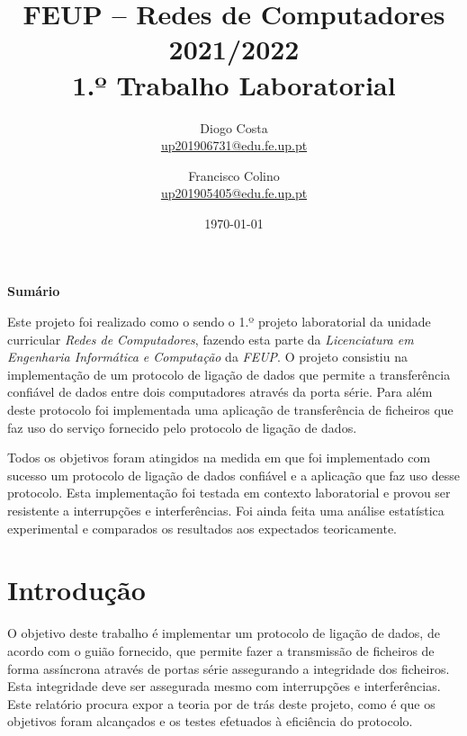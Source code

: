 \documentclass[a4paper,11pt,portuguese]{article}
\begin{document}

\author{
    Diogo Costa\\
    \href{mailto:up201906731@edu.fe.up.pt}{up201906731@edu.fe.up.pt}
    \and
    Francisco Colino\\
    \href{mailto:up201905405@edu.fe.up.pt}{up201905405@edu.fe.up.pt}
}
\title{FEUP -- Redes de Computadores \large 2021/2022 \\ \large 1.º Trabalho Laboratorial}
\date{\today}
\maketitle

\begin{center}
    \textbf{Sumário}
\end{center}

Este projeto foi realizado como o sendo o 1.º projeto laboratorial da unidade curricular
\textit{Redes de Computadores}, fazendo esta parte da \textit{Licenciatura em Engenharia
Informática e Computação} da \textit{FEUP}. O projeto consistiu na implementação de um
protocolo de ligação de dados que permite a transferência confiável de dados entre dois
computadores através da porta série. Para além deste protocolo foi implementada uma
aplicação de transferência de ficheiros que faz uso do serviço fornecido pelo protocolo
de ligação de dados. \par

Todos os objetivos foram atingidos na medida em que foi implementado com sucesso um
protocolo de ligação de dados confiável e a aplicação que faz uso desse protocolo. Esta
implementação foi testada em contexto laboratorial e provou ser resistente a interrupções
e interferências. Foi ainda feita uma análise estatística experimental e comparados os
resultados aos expectados teoricamente.


\section{Introdução}

    O objetivo deste trabalho é implementar um protocolo de ligação de dados, 
    de acordo com o guião fornecido, que permite fazer a transmissão de ficheiros 
    de forma assíncrona através de portas série assegurando a integridade dos ficheiros.
    Esta integridade deve ser assegurada mesmo com interrupções e interferências. 
    Este relatório procura expor a teoria por de trás deste projeto, como é que os
    objetivos foram alcançados e os testes efetuados à eficiência do protocolo. \par
\end{document}
